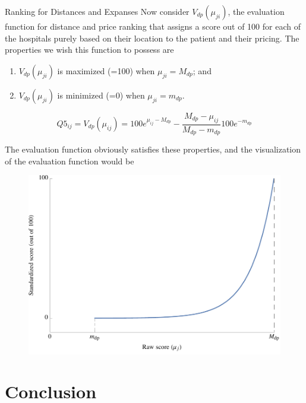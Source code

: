\documentclass[8pt, hyperref={colorlinks=true}]{beamer}
\begin{document}
\begin{frame}{Ranking for Distances and Expanses}
Now consider $V_{dp}\left(\mu_{ji}\right)$, the evaluation function for distance and price ranking that assigns a score out of 100 for each of the hospitals purely based on their location to the patient and their pricing. The properties we wish this function to possess are
\begin{enumerate}
    \item $V_{dp}\left(\mu_{ji}\right)$ is maximized (=100) when $\mu_{ji} = M_{dp}$; and
    \item $V_{dp}\left(\mu_{ji}\right)$ is minimized (=0) when $\mu_{ji} = m_{dp}$.
\end{enumerate}

\begin{definition}
\[
Q5_{ij}=V_{dp}\left(\mu_{ij}\right) = 100e^{\mu_{ij} - M_{dp}} - \frac{M_{dp} - \mu_{ij}}{M_{dp} - m_{dp}}100e^{-m_{dp}}
\]
\end{definition}

The evaluation function obviously satisfies these properties, and the visualization of the evaluation function would be

\begin{figure}[htbp]
    \centering
    \includegraphics[scale=.3]{v_dp.pdf}
    \label{fig:v_dp}
\end{figure}
\end{frame}

\section{Conclusion}
\end{document}
